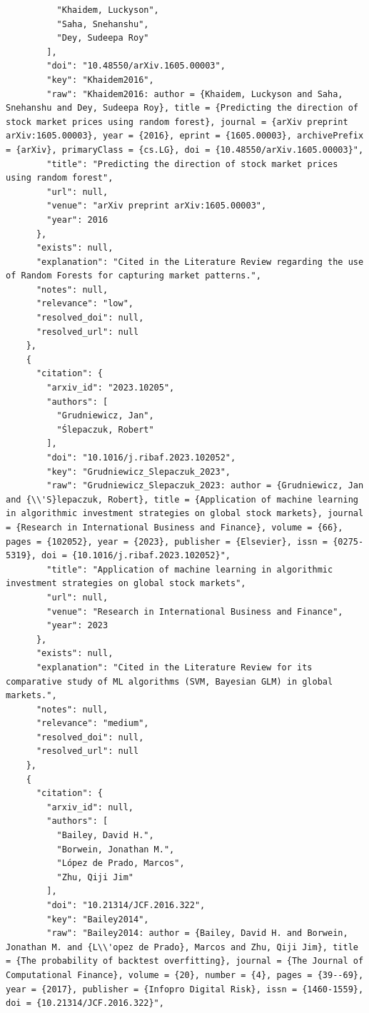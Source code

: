 \documentclass[11pt]{article}
\begin{document}
\begin{verbatim}
          "Khaidem, Luckyson",
          "Saha, Snehanshu",
          "Dey, Sudeepa Roy"
        ],
        "doi": "10.48550/arXiv.1605.00003",
        "key": "Khaidem2016",
        "raw": "Khaidem2016: author = {Khaidem, Luckyson and Saha, Snehanshu and Dey, Sudeepa Roy}, title = {Predicting the direction of stock market prices using random forest}, journal = {arXiv preprint arXiv:1605.00003}, year = {2016}, eprint = {1605.00003}, archivePrefix = {arXiv}, primaryClass = {cs.LG}, doi = {10.48550/arXiv.1605.00003}",
        "title": "Predicting the direction of stock market prices using random forest",
        "url": null,
        "venue": "arXiv preprint arXiv:1605.00003",
        "year": 2016
      },
      "exists": null,
      "explanation": "Cited in the Literature Review regarding the use of Random Forests for capturing market patterns.",
      "notes": null,
      "relevance": "low",
      "resolved_doi": null,
      "resolved_url": null
    },
    {
      "citation": {
        "arxiv_id": "2023.10205",
        "authors": [
          "Grudniewicz, Jan",
          "Ślepaczuk, Robert"
        ],
        "doi": "10.1016/j.ribaf.2023.102052",
        "key": "Grudniewicz_Slepaczuk_2023",
        "raw": "Grudniewicz_Slepaczuk_2023: author = {Grudniewicz, Jan and {\\'S}lepaczuk, Robert}, title = {Application of machine learning in algorithmic investment strategies on global stock markets}, journal = {Research in International Business and Finance}, volume = {66}, pages = {102052}, year = {2023}, publisher = {Elsevier}, issn = {0275-5319}, doi = {10.1016/j.ribaf.2023.102052}",
        "title": "Application of machine learning in algorithmic investment strategies on global stock markets",
        "url": null,
        "venue": "Research in International Business and Finance",
        "year": 2023
      },
      "exists": null,
      "explanation": "Cited in the Literature Review for its comparative study of ML algorithms (SVM, Bayesian GLM) in global markets.",
      "notes": null,
      "relevance": "medium",
      "resolved_doi": null,
      "resolved_url": null
    },
    {
      "citation": {
        "arxiv_id": null,
        "authors": [
          "Bailey, David H.",
          "Borwein, Jonathan M.",
          "López de Prado, Marcos",
          "Zhu, Qiji Jim"
        ],
        "doi": "10.21314/JCF.2016.322",
        "key": "Bailey2014",
        "raw": "Bailey2014: author = {Bailey, David H. and Borwein, Jonathan M. and {L\\'opez de Prado}, Marcos and Zhu, Qiji Jim}, title = {The probability of backtest overfitting}, journal = {The Journal of Computational Finance}, volume = {20}, number = {4}, pages = {39--69}, year = {2017}, publisher = {Infopro Digital Risk}, issn = {1460-1559}, doi = {10.21314/JCF.2016.322}",

\end{verbatim}
\end{document}
